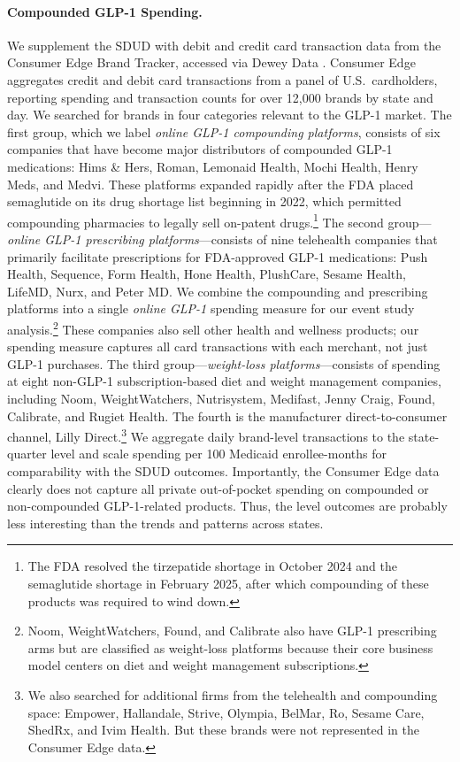 \paragraph{Compounded GLP-1 Spending.} We supplement the SDUD with debit and credit card transaction data from the Consumer Edge Brand Tracker, accessed via Dewey Data \citep{consumeredge2025brandtracker}. Consumer Edge aggregates credit and debit card transactions from a panel of U.S.\ cardholders, reporting spending and transaction counts for over 12,000 brands by state and day. We searched for brands in four categories relevant to the GLP-1 market. The first group, which we label \emph{online GLP-1 compounding platforms}, consists of six companies that have become major distributors of compounded GLP-1 medications: Hims \& Hers, Roman, Lemonaid Health, Mochi Health, Henry Meds, and Medvi. These platforms expanded rapidly after the FDA placed semaglutide on its drug shortage list beginning in 2022, which permitted compounding pharmacies to legally sell on-patent drugs.\footnote{The FDA resolved the tirzepatide shortage in October 2024 and the semaglutide shortage in February 2025, after which compounding of these products was required to wind down.} The second group---\emph{online GLP-1 prescribing platforms}---consists of nine telehealth companies that primarily facilitate prescriptions for FDA-approved GLP-1 medications: Push Health, Sequence, Form Health, Hone Health, PlushCare, Sesame Health, LifeMD, Nurx, and Peter MD. We combine the compounding and prescribing platforms into a single \emph{online GLP-1} spending measure for our event study analysis.\footnote{Noom, WeightWatchers, Found, and Calibrate also have GLP-1 prescribing arms but are classified as weight-loss platforms because their core business model centers on diet and weight management subscriptions.} These companies also sell other health and wellness products; our spending measure captures all card transactions with each merchant, not just GLP-1 purchases. The third group---\emph{weight-loss platforms}---consists of spending at eight non-GLP-1 subscription-based diet and weight management companies, including Noom, WeightWatchers, Nutrisystem, Medifast, Jenny Craig, Found, Calibrate, and Rugiet Health. The fourth is the manufacturer direct-to-consumer channel, Lilly Direct.\footnote{We also searched for additional firms from the telehealth and compounding space: Empower, Hallandale, Strive, Olympia, BelMar, Ro, Sesame Care, ShedRx, and Ivim Health. But these brands were not represented in the Consumer Edge data.} We aggregate daily brand-level transactions to the state-quarter level and scale spending per 100 Medicaid enrollee-months for comparability with the SDUD outcomes. Importantly, the Consumer Edge data clearly does not capture all private out-of-pocket spending on compounded or non-compounded GLP-1-related products. Thus, the level outcomes are probably less interesting than the trends and patterns across states.
